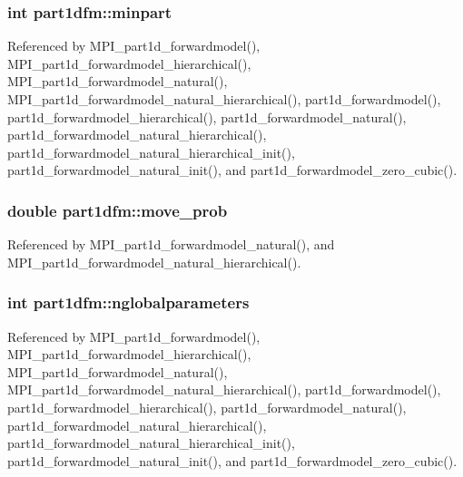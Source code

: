 \subsubsection[{\texorpdfstring{minpart}{minpart}}]{\setlength{\rightskip}{0pt plus 5cm}int part1dfm\+::minpart}\hypertarget{structpart1dfm_a0b2fd8202f99a776de436a1e7b52fd50}{}\label{structpart1dfm_a0b2fd8202f99a776de436a1e7b52fd50}


Referenced by M\+P\+I\+\_\+part1d\+\_\+forwardmodel(), M\+P\+I\+\_\+part1d\+\_\+forwardmodel\+\_\+hierarchical(), M\+P\+I\+\_\+part1d\+\_\+forwardmodel\+\_\+natural(), M\+P\+I\+\_\+part1d\+\_\+forwardmodel\+\_\+natural\+\_\+hierarchical(), part1d\+\_\+forwardmodel(), part1d\+\_\+forwardmodel\+\_\+hierarchical(), part1d\+\_\+forwardmodel\+\_\+natural(), part1d\+\_\+forwardmodel\+\_\+natural\+\_\+hierarchical(), part1d\+\_\+forwardmodel\+\_\+natural\+\_\+hierarchical\+\_\+init(), part1d\+\_\+forwardmodel\+\_\+natural\+\_\+init(), and part1d\+\_\+forwardmodel\+\_\+zero\+\_\+cubic().

\subsubsection[{\texorpdfstring{move\+\_\+prob}{move_prob}}]{\setlength{\rightskip}{0pt plus 5cm}double part1dfm\+::move\+\_\+prob}\hypertarget{structpart1dfm_add9f0763156a60750d75a28483a53824}{}\label{structpart1dfm_add9f0763156a60750d75a28483a53824}


Referenced by M\+P\+I\+\_\+part1d\+\_\+forwardmodel\+\_\+natural(), and M\+P\+I\+\_\+part1d\+\_\+forwardmodel\+\_\+natural\+\_\+hierarchical().

\subsubsection[{\texorpdfstring{nglobalparameters}{nglobalparameters}}]{\setlength{\rightskip}{0pt plus 5cm}int part1dfm\+::nglobalparameters}\hypertarget{structpart1dfm_ad84d22cd023a1c92efb40dbcbbfd03c9}{}\label{structpart1dfm_ad84d22cd023a1c92efb40dbcbbfd03c9}


Referenced by M\+P\+I\+\_\+part1d\+\_\+forwardmodel(), M\+P\+I\+\_\+part1d\+\_\+forwardmodel\+\_\+hierarchical(), M\+P\+I\+\_\+part1d\+\_\+forwardmodel\+\_\+natural(), M\+P\+I\+\_\+part1d\+\_\+forwardmodel\+\_\+natural\+\_\+hierarchical(), part1d\+\_\+forwardmodel(), part1d\+\_\+forwardmodel\+\_\+hierarchical(), part1d\+\_\+forwardmodel\+\_\+natural(), part1d\+\_\+forwardmodel\+\_\+natural\+\_\+hierarchical(), part1d\+\_\+forwardmodel\+\_\+natural\+\_\+hierarchical\+\_\+init(), part1d\+\_\+forwardmodel\+\_\+natural\+\_\+init(), and part1d\+\_\+forwardmodel\+\_\+zero\+\_\+cubic().

